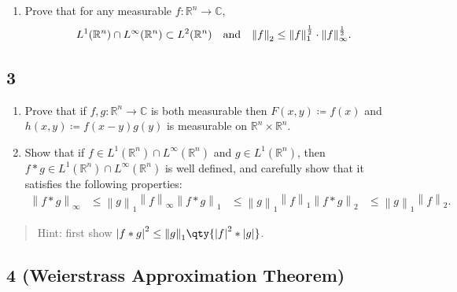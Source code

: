 \begin{enumerate}
\def\labelenumi{\alph{enumi}.}
\setcounter{enumi}{1}
\tightlist
\item
  Prove that for any measurable \(f:{\mathbb{R}}^n \to {\mathbb{C}}\),
  \begin{align*}
  L^1({\mathbb{R}}^n) \cap L^\infty({\mathbb{R}}^n) \subset L^2({\mathbb{R}}^n) {\quad \operatorname{and} \quad} {\left\lVert {f} \right\rVert}_2 \leq {\left\lVert {f} \right\rVert}_1^{1\over 2} \cdot {\left\lVert {f} \right\rVert}_\infty^{1\over 2}
  .\end{align*}
\end{enumerate}

\hypertarget{section-3}{%
\subsection{3}\label{section-3}}

\begin{enumerate}
\def\labelenumi{\alph{enumi}.}
\item
  Prove that if \(f, g: {\mathbb{R}}^n\to {\mathbb{C}}\) is both
  measurable then \(F(x, y) \coloneqq f(x)\) and
  \(h(x, y)\coloneqq f(x-y) g(y)\) is measurable on
  \({\mathbb{R}}^n\times{\mathbb{R}}^n\).
\item
  Show that if
  \(f\in L^1({\mathbb{R}}^n) \cap L^\infty({\mathbb{R}}^n)\) and
  \(g\in L^1({\mathbb{R}}^n)\), then
  \(f\ast g \in L^1({\mathbb{R}}^n) \cap L^\infty({\mathbb{R}}^n)\) is
  well defined, and carefully show that it satisfies the following
  properties:
  \begin{align*}
  {\left\lVert {f\ast g} \right\rVert}_\infty &\leq {\left\lVert {g} \right\rVert}_1 {\left\lVert {f} \right\rVert}_\infty
  {\left\lVert {f\ast g} \right\rVert}_1      &\leq {\left\lVert {g} \right\rVert}_1 {\left\lVert {f} \right\rVert}_1
  {\left\lVert {f\ast g} \right\rVert}_2      &\leq {\left\lVert {g} \right\rVert}_1 {\left\lVert {f} \right\rVert}_2
  .\end{align*}
\end{enumerate}

\begin{quote}
Hint: first show
\({\left\lvert {f\ast g} \right\rvert}^2 \leq {\left\lVert {g} \right\rVert}_1 \qty{ {\left\lvert {f} \right\rvert}^2 \ast {\left\lvert {g} \right\rvert}}\).
\end{quote}

\hypertarget{weierstrass-approximation-theorem}{%
\subsection{4 (Weierstrass Approximation
Theorem)}\label{weierstrass-approximation-theorem}}

